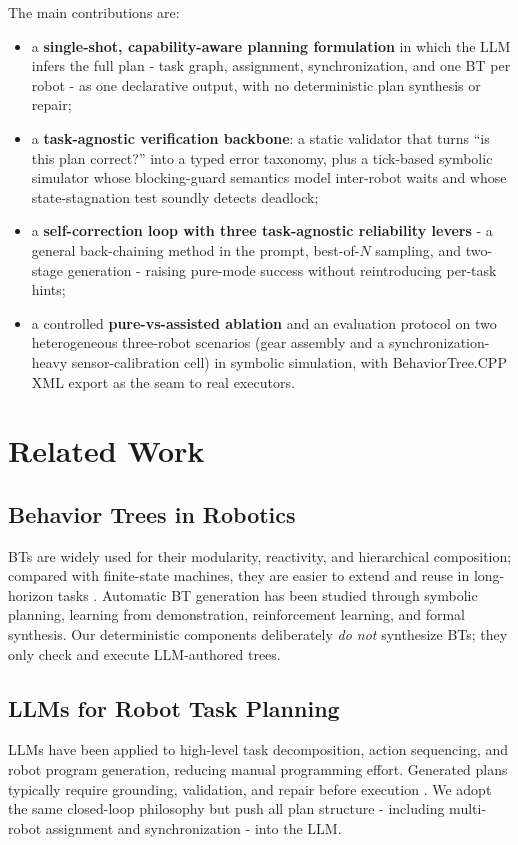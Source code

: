 \documentclass[journal]{IEEEtran}
\begin{document}
The main contributions are:
\begin{itemize}
    \item a \textbf{single-shot, capability-aware planning formulation} in which the LLM infers the full plan - task graph, assignment, synchronization, and one BT per robot - as one declarative output, with no deterministic plan synthesis or repair;
    \item a \textbf{task-agnostic verification backbone}: a static validator that turns ``is this plan correct?'' into a typed error taxonomy, plus a tick-based symbolic simulator whose blocking-guard semantics model inter-robot waits and whose state-stagnation test soundly detects deadlock;
    \item a \textbf{self-correction loop with three task-agnostic reliability levers} - a general back-chaining method in the prompt, best-of-$N$ sampling, and two-stage generation - raising pure-mode success without reintroducing per-task hints;
    \item a controlled \textbf{pure-vs-assisted ablation} and an evaluation protocol on two heterogeneous three-robot scenarios (gear assembly and a synchronization-heavy sensor-calibration cell) in symbolic simulation, with BehaviorTree.CPP XML export as the seam to real executors.
\end{itemize}

\section{Related Work}

\subsection{Behavior Trees in Robotics}
BTs are widely used for their modularity, reactivity, and hierarchical composition; compared with finite-state machines, they are easier to extend and reuse in long-horizon tasks \cite{colledanchise2018bt,iovino2022survey}. Automatic BT generation has been studied through symbolic planning, learning from demonstration, reinforcement learning, and formal synthesis. Our deterministic components deliberately \emph{do not} synthesize BTs; they only check and execute LLM-authored trees.

\subsection{LLMs for Robot Task Planning}
LLMs have been applied to high-level task decomposition, action sequencing, and robot program generation, reducing manual programming effort. Generated plans typically require grounding, validation, and repair before execution \cite{ahn2022saycan,singh2023progprompt,driess2023palme}. We adopt the same closed-loop philosophy but push all plan structure - including multi-robot assignment and synchronization - into the LLM.
\end{document}
